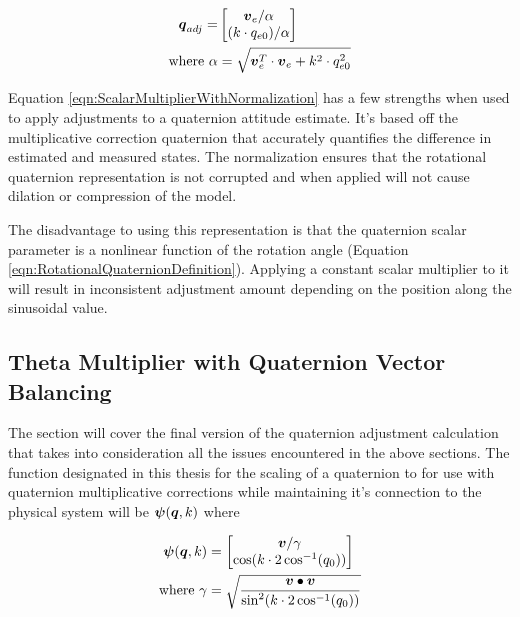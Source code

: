 \begin{equation}
  \begin{aligned}
  \boldsymbol{q}_{adj} = & \begin{bmatrix} \boldsymbol{v}_e / \alpha \\ ( k \cdot q_{e0} )  / \alpha \end{bmatrix} \\
  \text{where } \alpha & = \sqrt{\boldsymbol{v}_e^T \cdot \boldsymbol{v}_e + k^2 \cdot q_{e0}^2}
  \end{aligned}
  \label{eqn:ScalarMultiplierWithNormalization}
\end{equation}

Equation \ref{eqn:ScalarMultiplierWithNormalization} has a few strengths when used to apply adjustments to a quaternion attitude estimate.  It's based off the multiplicative correction quaternion that accurately quantifies the difference in estimated and measured states.  The normalization ensures that the rotational quaternion representation is not corrupted and when applied will not cause dilation or compression of the model.

The disadvantage to using this representation is that the quaternion scalar parameter is a nonlinear function of the rotation angle (Equation \ref{eqn:RotationalQuaternionDefinition}).  Applying a constant scalar multiplier to it will result in inconsistent adjustment amount depending on the position along the sinusoidal value.

\subsection{Theta Multiplier with Quaternion Vector Balancing}
\label{subsec:ThetaMultiplierWithQuaternionVectorBalancing}

The section will cover the final version of the quaternion adjustment calculation that takes into consideration all the issues encountered in the above sections.  The function designated in this thesis for the scaling of a quaternion to for use with quaternion multiplicative corrections while maintaining it's connection to the physical system will be $\boldsymbol{\psi}(\boldsymbol{q}, k)$ where

\begin{equation}
  \begin{aligned}
    \boldsymbol{\psi}(\boldsymbol{q}, k) &= \begin{bmatrix} \boldsymbol{v} / \gamma \\ \cos ( k \cdot 2\cos^{-1} (q_0))  \end{bmatrix} \\
    \text{where } \gamma &= \sqrt{\frac{\boldsymbol{v} \bullet \boldsymbol{v}}{\sin^2 ( k \cdot 2\cos^{-1} (q_0))}} \\
  \end{aligned}
  \label{eqn:PSI}
\end{equation}

